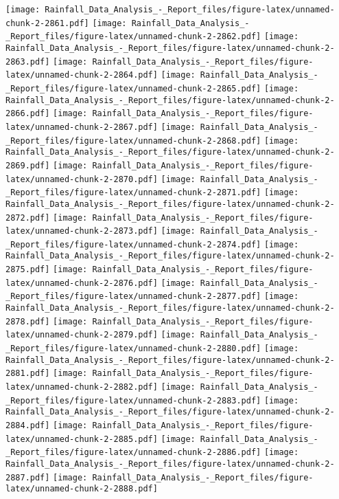 \documentclass[
]{article}
\begin{document}
\texttt{[image: Rainfall\_Data\_Analysis\_-\_Report\_files/figure-latex/unnamed-chunk-2-2861.pdf]}
\texttt{[image: Rainfall\_Data\_Analysis\_-\_Report\_files/figure-latex/unnamed-chunk-2-2862.pdf]}
\texttt{[image: Rainfall\_Data\_Analysis\_-\_Report\_files/figure-latex/unnamed-chunk-2-2863.pdf]}
\texttt{[image: Rainfall\_Data\_Analysis\_-\_Report\_files/figure-latex/unnamed-chunk-2-2864.pdf]}
\texttt{[image: Rainfall\_Data\_Analysis\_-\_Report\_files/figure-latex/unnamed-chunk-2-2865.pdf]}
\texttt{[image: Rainfall\_Data\_Analysis\_-\_Report\_files/figure-latex/unnamed-chunk-2-2866.pdf]}
\texttt{[image: Rainfall\_Data\_Analysis\_-\_Report\_files/figure-latex/unnamed-chunk-2-2867.pdf]}
\texttt{[image: Rainfall\_Data\_Analysis\_-\_Report\_files/figure-latex/unnamed-chunk-2-2868.pdf]}
\texttt{[image: Rainfall\_Data\_Analysis\_-\_Report\_files/figure-latex/unnamed-chunk-2-2869.pdf]}
\texttt{[image: Rainfall\_Data\_Analysis\_-\_Report\_files/figure-latex/unnamed-chunk-2-2870.pdf]}
\texttt{[image: Rainfall\_Data\_Analysis\_-\_Report\_files/figure-latex/unnamed-chunk-2-2871.pdf]}
\texttt{[image: Rainfall\_Data\_Analysis\_-\_Report\_files/figure-latex/unnamed-chunk-2-2872.pdf]}
\texttt{[image: Rainfall\_Data\_Analysis\_-\_Report\_files/figure-latex/unnamed-chunk-2-2873.pdf]}
\texttt{[image: Rainfall\_Data\_Analysis\_-\_Report\_files/figure-latex/unnamed-chunk-2-2874.pdf]}
\texttt{[image: Rainfall\_Data\_Analysis\_-\_Report\_files/figure-latex/unnamed-chunk-2-2875.pdf]}
\texttt{[image: Rainfall\_Data\_Analysis\_-\_Report\_files/figure-latex/unnamed-chunk-2-2876.pdf]}
\texttt{[image: Rainfall\_Data\_Analysis\_-\_Report\_files/figure-latex/unnamed-chunk-2-2877.pdf]}
\texttt{[image: Rainfall\_Data\_Analysis\_-\_Report\_files/figure-latex/unnamed-chunk-2-2878.pdf]}
\texttt{[image: Rainfall\_Data\_Analysis\_-\_Report\_files/figure-latex/unnamed-chunk-2-2879.pdf]}
\texttt{[image: Rainfall\_Data\_Analysis\_-\_Report\_files/figure-latex/unnamed-chunk-2-2880.pdf]}
\texttt{[image: Rainfall\_Data\_Analysis\_-\_Report\_files/figure-latex/unnamed-chunk-2-2881.pdf]}
\texttt{[image: Rainfall\_Data\_Analysis\_-\_Report\_files/figure-latex/unnamed-chunk-2-2882.pdf]}
\texttt{[image: Rainfall\_Data\_Analysis\_-\_Report\_files/figure-latex/unnamed-chunk-2-2883.pdf]}
\texttt{[image: Rainfall\_Data\_Analysis\_-\_Report\_files/figure-latex/unnamed-chunk-2-2884.pdf]}
\texttt{[image: Rainfall\_Data\_Analysis\_-\_Report\_files/figure-latex/unnamed-chunk-2-2885.pdf]}
\texttt{[image: Rainfall\_Data\_Analysis\_-\_Report\_files/figure-latex/unnamed-chunk-2-2886.pdf]}
\texttt{[image: Rainfall\_Data\_Analysis\_-\_Report\_files/figure-latex/unnamed-chunk-2-2887.pdf]}
\texttt{[image: Rainfall\_Data\_Analysis\_-\_Report\_files/figure-latex/unnamed-chunk-2-2888.pdf]}
\end{document}
